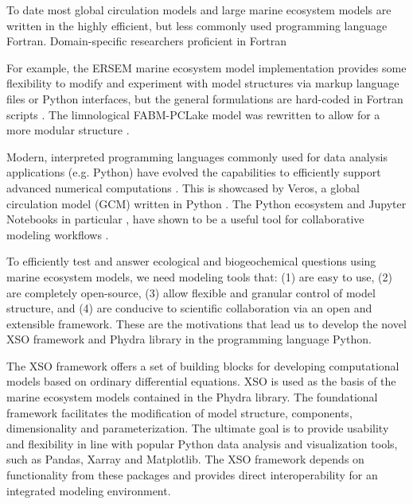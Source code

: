 \documentclass[journal abbreviation, manuscript]{copernicus}
\begin{document}
To date most global circulation models and large marine ecosystem models are written in the highly efficient, but less commonly used programming language Fortran. Domain-specific researchers proficient in Fortran 

For example, the ERSEM marine ecosystem model implementation provides some flexibility to modify and experiment with model structures via markup language files or Python interfaces, but the general formulations are hard-coded in Fortran scripts \citep{Butenschon2016}. The limnological FABM-PCLake model was rewritten to allow for a more modular structure \citep[][]{Schnedler-Meyer2022WaterModel}. 

Modern, interpreted programming languages commonly used for data analysis applications (e.g. Python) have evolved the capabilities to efficiently support advanced numerical computations \citep{Lin2012}. This is showcased by Veros, a global circulation model (GCM) written in Python \citep{Hafner2018VerosPython}. The Python ecosystem and Jupyter Notebooks in particular \citep{Kluyver2016JupyterWorkflows}, have shown to be a useful tool for collaborative modeling workflows \citep[e.g. eWaterCycle platform,][]{Hut2022TheCollaboration}. 



To efficiently test and answer ecological and biogeochemical questions using marine ecosystem models, we need modeling tools that: (1) are easy to use, (2) are completely open-source, (3) allow flexible and granular control of model structure, and (4) are conducive to scientific collaboration via an open and extensible framework. These are the motivations that lead us to develop the novel XSO framework and Phydra library in the programming language Python. 

The XSO framework offers a set of building blocks for developing computational models based on ordinary differential equations. XSO is used as the basis of the marine ecosystem models contained in the Phydra library. The foundational framework facilitates the modification of model structure, components, dimensionality and parameterization. The ultimate goal is to provide usability and flexibility in line with popular Python data analysis and visualization tools, such as Pandas, Xarray and Matplotlib. The XSO framework depends on functionality from these packages and provides direct interoperability for an integrated modeling environment.
\end{document}
